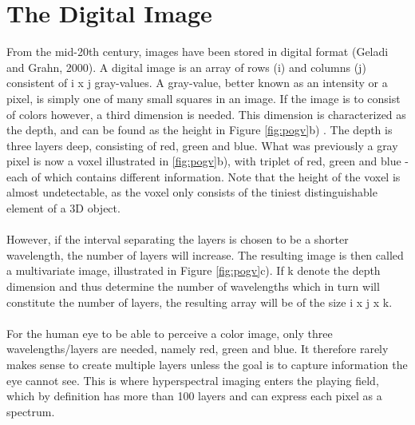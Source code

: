 \section{The Digital Image}
From the mid-20th century, images have been stored in digital format (Geladi and Grahn, 2000). A digital image is an array of rows (i) and columns (j) consistent of i x j gray-values. A gray-value, better known as an intensity or a pixel, is simply one of many small squares in an image. If the image is to consist of colors however, a third dimension is needed. This dimension is characterized as the depth, and can be found as the height in Figure \ref{fig:pogv}b) . The depth is three layers deep, consisting of red, green and blue. What was previously a gray pixel is now a voxel illustrated in \ref{fig:pogv}b), with triplet of red, green and blue - each of which contains different information. Note that the height of the voxel is almost undetectable, as the voxel only consists of the tiniest distinguishable element of a 3D object.
\\\\
However, if the interval separating the layers is chosen to be a shorter wavelength, the number of layers will increase. The resulting image is then called a multivariate image, illustrated in Figure \ref{fig:pogv}c). If k denote the depth dimension and thus determine the number of wavelengths which in turn will constitute the number of layers, the resulting array will be of the size i x j x k.
\\\\
For the human eye to be able to perceive a color image, only three wavelengths/layers are needed, namely red, green and blue. It therefore rarely makes sense to create multiple layers unless the goal is to capture information the eye cannot see. This is where hyperspectral imaging enters the playing field, which by definition has more than 100 layers and can express each pixel as a spectrum.

